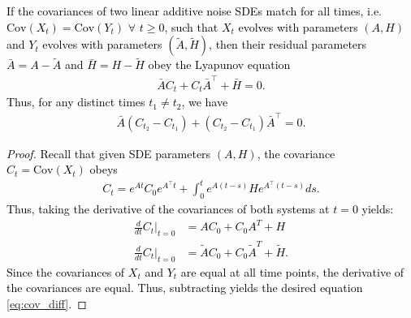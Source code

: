 \documentclass[twoside,11pt]{article}
\newcommand{\cov} {\mathrm{Cov}}
\newcommand{\rv}[1]{\textcolor{black}{#1}}
\begin{document}



\rv{\begin{lemma}
If the covariances of two linear additive noise SDEs match for all times, i.e. $\cov(X_t) = \cov(Y_t)$ $\forall $ $t \ge 0$, such that $X_t$ evolves with parameters $(A,H)$ and $Y_t$ evolves with parameters $(\tilde{A}, \tilde{H})$, then their residual parameters $\bar{A}=A-\tilde{A}$ and $\bar{H}=H-\tilde{H}$ obey the Lyapunov equation
\begin{align}
    \bar{A}C_t + C_t \bar{A}^\top + \bar{H} = 0.
    \label{eq: differential_Lyapunov}
\end{align}
Thus, for any distinct times $t_1 \neq t_2$, we have
\begin{align}
    \bar{A} (C_{t_2}-C_{t_1}) + (C_{t_2}-C_{t_1})  \bar{A}^\top = 0.
    \label{eq:cov_diff}
\end{align}
\label{lemma:non_iden_imply_diff_drift}
\end{lemma}
\begin{proof}
Recall that given SDE parameters $(A,H)$, the covariance $C_t = \cov(X_t)$ obeys
\begin{align}
    C_t = e^{At}C_0 e^{A^\top t} + \int_{0}^t e^{A(t-s)}He^{A^\top (t-s)}ds.
    \label{eq:covariance_of_lin_sde}
\end{align}
Thus, taking the derivative of the covariances of both systems at $t=0$ yields:
\begin{align}
\frac{d}{dt}C_t\bigg\rvert_{t=0}&= AC_0 + C_0 A^T + H 
\label{eq:deriv_cov_1}
\\
\frac{d}{dt}C_t\bigg\rvert_{t=0}&= \tilde{A}C_0+ C_0\tilde{A}^T + \tilde{H}.
\label{eq:deriv_cov_2}
\end{align}
Since the covariances of $X_t$ and $Y_t$ are equal at all time points, the derivative of the covariances are equal. Thus, subtracting yields the desired equation \eqref{eq:cov_diff}.
\end{proof}}
\end{document}
